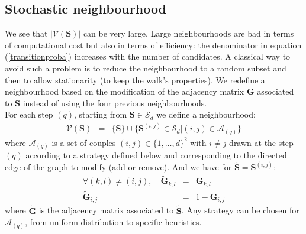 \documentclass[12pt,a4paper]{report}
\begin{document}
	\subsection{Stochastic neighbourhood}
	We see that $|\mathcal{V}(\boldsymbol{S})|$ can be very large. Large neighbourhoods are bad in terms of computational cost but also in terms of efficiency: the denominator in equation (\ref{transitionproba}) increases with the number of candidates. A classical way to avoid such a problem is to reduce the neighbourhood to a random subset and then to allow stationarity (to keep the walk's properties). %
	  We 
	  redefine a neighbourhood based on the modification of the adjacency matrix $\boldsymbol{G}$ associated to $\boldsymbol{S}$ instead of using the four previous neighbourhoods.\\
	  	
For each step $(q)$, starting from $\boldsymbol{S} \in \mathcal{S}_d$ we define a neighbourhood:
		\begin{eqnarray}
		\mathcal{V}(\boldsymbol{S})&=& \{\boldsymbol{S} \}\cup \{ \boldsymbol{S}^{(i,j)} \in \mathcal{S}_d|(i,j) \in \mathcal{A}_{(q)}\} \nonumber 
	\end{eqnarray}	
	where $\mathcal{A}_{(q)}$ is a set of couples $(i,j) \in \{1,\dots,d \}^2$ with $i\neq j$ drawn at the step $(q)$ according to a strategy defined below and corresponding to the directed edge of the graph to modify (add or remove).
	And we have for  $\tilde{\boldsymbol{S}}=\boldsymbol{S}^{(i,j)}$:
	\begin{eqnarray}
		\forall (k,l)\neq (i,j), \quad	\tilde{\boldsymbol{G}}_{k,l}&=&\boldsymbol{G}_{k,l} \nonumber  \\
		\tilde{\boldsymbol{G}}_{i,j}&=&1-\boldsymbol{G}_{i,j}  \nonumber 
	\end{eqnarray}
	where $\tilde{\boldsymbol{G}}$ is the adjacency matrix associated to $\tilde{\boldsymbol{S}}$. Any strategy can be chosen for $\mathcal{A}_{(q)}$, from uniform distribution to specific heuristics.\\
	
\end{document}
